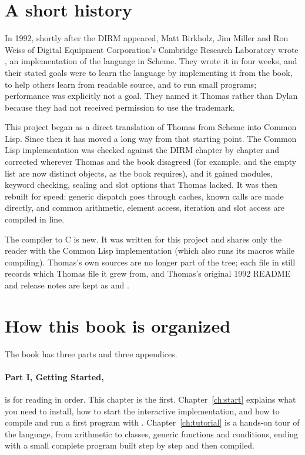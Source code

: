 \section{A short history}\label{sec:intro-history}

In 1992, shortly after the DIRM appeared, Matt Birkholz, Jim Miller and
Ron Weiss of Digital Equipment Corporation's Cambridge Research Laboratory
wrote , an implementation of the language in Scheme. They
wrote it in four weeks, and their stated goals were to learn the language
by implementing it from the book, to help others learn from readable
source, and to run small programs; performance was explicitly not a goal.
They named it Thomas rather than Dylan because they had not received
permission to use the trademark.

This project began as a direct translation of Thomas from Scheme into
Common Lisp. Since then it has moved a long way from that starting point.
The Common Lisp implementation was checked against the DIRM chapter by
chapter and corrected wherever Thomas and the book disagreed (for example,
 and the empty list are now distinct objects, as the book
requires), and it gained modules, keyword checking, sealing and slot
options that Thomas lacked. It was then rebuilt for speed: generic
dispatch goes through caches, known calls are made directly, and common
arithmetic, element access, iteration and slot access are compiled in line.

The compiler to C is new. It was written for this project and shares only
the reader with the Common Lisp implementation (which also runs its macros
while compiling). Thomas's own sources are no longer part of the tree;
each file in  still records which Thomas file it grew from, and
Thomas's original 1992 README and release notes are kept as
 and .

\section{How this book is organized}\label{sec:intro-organization}

The book has three parts and three appendices.

\paragraph{Part I, Getting Started,} is for reading in order.
This chapter is the first. Chapter~\ref{ch:start} explains what you need
to install, how to start the interactive implementation, and how to
compile and run a first program with .
Chapter~\ref{ch:tutorial} is a hands-on tour of the language, from
arithmetic to classes, generic functions and conditions, ending with a
small complete program built step by step and then compiled.

